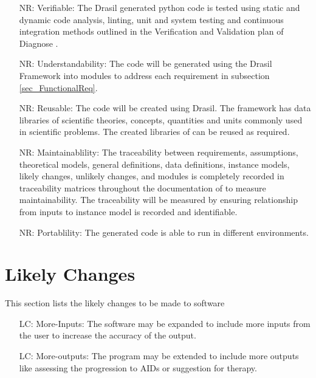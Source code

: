 \documentclass[12pt]{article}
\newcounter{reqnum} %
\newcounter{nreqnum} %
\newcounter{lcnum} %
\begin{document}
\noindent \begin{itemize}

\item[NR\refstepcounter{nreqnum}\thenreqnum \label{NR_Verifiable}:] 
Verifiable: The Drasil generated python code is tested using static and dynamic 
code analysis, linting, unit and system testing and continuous integration 
methods outlined in the Verification and Validation plan of Diagnose 
\citep{DiagnoseVNVplan}.


\item[NR\refstepcounter{nreqnum}\thenreqnum \label{NR_Understandability}:] 
Understandability: The code will be generated using the Drasil Framework into 
modules to address each requirement in subsection \ref{sec_FunctionalReq}.

\item[NR\refstepcounter{nreqnum}\thenreqnum \label{NR_Reusable}:] 
Reusable: The code will be created using Drasil. The framework has data 
libraries of scientific theories, concepts, quantities and units commonly used 
in scientific problems. The created libraries of \progname{} can be reused as 
required. \citep{Drasilcreate}

\item[NR\refstepcounter{nreqnum}\thenreqnum \label{NR_Maintainability}:] 
Maintainablility: The traceability between requirements, assumptions, 
theoretical models, general 
definitions, data definitions, instance models, likely changes, unlikely 
changes, and modules is completely recorded in traceability matrices throughout 
the documentation of  \progname{} to measure maintainability. The traceability 
will be measured by 
ensuring relationship from inputs to instance model is recorded and 
identifiable. 

\item[NR\refstepcounter{nreqnum}\thenreqnum \label{NR_Portablility}:] 
Portablility: The generated code is able to run in different environments. 


\end{itemize}


\section{Likely Changes} 

This section lists the likely changes to be made to software   

\noindent \begin{itemize}

\item[LC\refstepcounter{lcnum}\thelcnum\label{LC_more_inputs}:] More-Inputs: The 
software may be expanded to include more inputs from the user to increase the 
accuracy of the output.

\item[LC\refstepcounter{lcnum}\thelcnum\label{LC_more_outputs}:] 
More-outputs: The program may be extended to include more outputs like assessing 
the progression to AIDs or suggestion for therapy.
\end{itemize}
\end{document}
